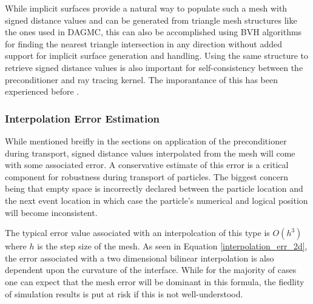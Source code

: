 \documentclass[12pt, a4paper]{article}
\begin{document}
While implicit surfaces provide a natural way to populate such a mesh with signed distance values and can be generated from triangle mesh structures like the ones used in DAGMC, this can also be accomplished using BVH algorithms for finding the nearest triangle intersection in any direction without added support for implicit surface generation and handling. Using the same structure to retrieve signed distance values is also important for self-consistency between the preconditioner and ray tracing kernel. The imporantance of this has been experienced before \cite{Smith_2011}.

\subsubsection{Interpolation Error Estimation}

While mentioned breifly in the sections on application of the preconditioner during transport, signed distance values interpolated from the mesh will come with some associated error. A conservative estimate of this error is a critical component for robustness during transport of particles. The biggest concern being that empty space is incorrectly declared between the particle location and the next event location in which case the particle's numerical and logical position will become inconsistent.


The typical error value associated with an interpolcation of this type is $O(h^3)$ where $h$ is the step size of the mesh. As seen in Equation \ref{interpolation_err_2d}, the error associated with a two dimensional bilinear interpolation is also dependent upon the curvature of the interface. While for the majority of cases one can expect that the mesh error will be dominant in this formula, the fiedlity of simulation results is put at risk if this is not well-understood. 





\end{document}
